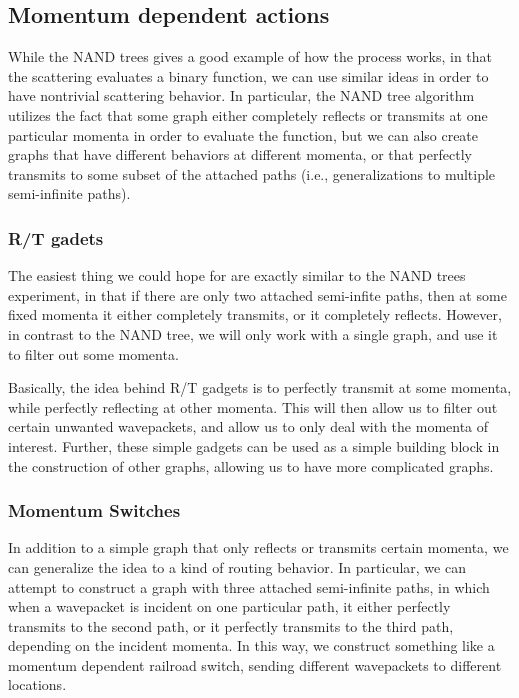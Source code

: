 \documentclass[../thesis-main/thesis-main]{subfiles}
\begin{document}
\subsection{Momentum dependent actions}

While the NAND trees gives a good example of how the process works, in that the scattering evaluates a binary function, we can use similar ideas in order to have nontrivial scattering behavior.  In particular, the NAND tree algorithm utilizes the fact that some graph either completely reflects or transmits at one particular momenta in order to evaluate the function, but we can also create graphs that have different behaviors at different momenta, or that perfectly transmits to some subset of the attached paths (i.e., generalizations to multiple semi-infinite paths).


\subsubsection{R/T gadets}

The easiest thing we could hope for are exactly similar to the NAND trees experiment, in that if there are only two attached semi-infite paths, then at some fixed momenta it either completely transmits, or it completely reflects.  However, in contrast to the NAND tree, we will only work with a single graph, and use it to filter out some momenta.

Basically, the idea behind R/T gadgets is to perfectly transmit at some momenta, while perfectly reflecting at other momenta.  This will then allow us to filter out certain unwanted wavepackets, and allow us to only deal with the momenta of interest.  Further, these simple gadgets can be used as a simple building block in the construction of other graphs, allowing us to have more complicated graphs.


\subsubsection{Momentum Switches}

In addition to a simple graph that only reflects or transmits certain momenta, we can generalize the idea to a kind of routing behavior.  In particular, we can attempt to construct a graph with three attached semi-infinite paths, in which when a wavepacket is incident on one particular path, it either perfectly transmits to the second path, or it perfectly transmits to the third path, depending on the incident momenta.  In this way, we construct something like a momentum dependent railroad switch, sending different wavepackets to different locations.
\end{document}
